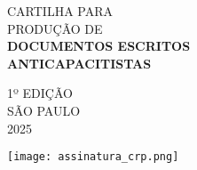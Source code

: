 \vspace*{\fill}
\begin{minipage}{0.3\textwidth}
    \hfill
\end{minipage}%
\begin{minipage}{0.7\textwidth}
\begin{flushleft}
\fininha\LARGE
\color{crp2}CARTILHA PARA\\PRODUÇÃO DE\\
\media\color{crp1}\textbf{DOCUMENTOS ESCRITOS\\ANTICAPACITISTAS}
\vspace*{2\baselineskip}

\color{crp3}
\Light
\normalsize
1º EDIÇÃO\\
SÃO PAULO\\
2025
\end{flushleft}
\end{minipage}
\vspace*{\baselineskip}
\begin{center}
    \texttt{[image: assinatura\_crp.png]}
\end{center}
